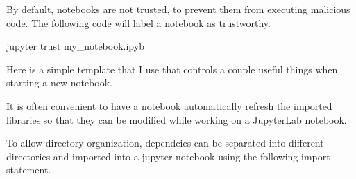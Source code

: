 \documentclass[]{book}
\newenvironment{Shaded}{\begin{snugshade}}{\end{snugshade}}
\newcommand{\DecValTok}[1]{\textcolor[rgb]{0.00,0.00,0.81}{#1}}
\newcommand{\ImportTok}[1]{#1}
\newcommand{\NormalTok}[1]{#1}
\newcommand{\OperatorTok}[1]{\textcolor[rgb]{0.81,0.36,0.00}{\textbf{#1}}}
\newcommand{\StringTok}[1]{\textcolor[rgb]{0.31,0.60,0.02}{#1}}
\begin{document}
By default, notebooks are not trusted, to prevent them from executing malicious code. The following code will label a notebook as trustworthy.

\begin{Shaded}
\begin{Highlighting}[]
\NormalTok{jupyter trust my_notebook.ipyb}
\end{Highlighting}
\end{Shaded}

Here is a simple template that I use that controls a couple useful things when starting a new notebook.

\begin{Shaded}
\end{Shaded}

It is often convenient to have a notebook automatically refresh the imported libraries so that they can be modified while working on a JupyterLab notebook.

\begin{Shaded}
\begin{Highlighting}[]
\OperatorTok{%}\NormalTok{reload_ext autoreload}
\OperatorTok{%}\NormalTok{autoreload }\DecValTok{2}
\end{Highlighting}
\end{Shaded}

To allow directory organization, dependcies can be separated into different directories and imported into a jupyter notebook using the following import statement.
\end{document}
